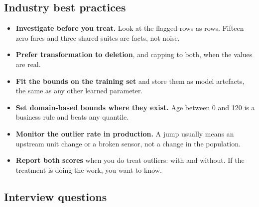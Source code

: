 \documentclass[11pt,a4paper]{article}
\begin{document}
\subsection*{Industry best practices}

\begin{itemize}\itemsep3pt
  \item \textbf{Investigate before you treat.} Look at the flagged rows as rows. Fifteen
        zero fares and three shared suites are facts, not noise.
  \item \textbf{Prefer transformation to deletion}, and capping to both, when the values
        are real.
  \item \textbf{Fit the bounds on the training set} and store them as model artefacts, the
        same as any other learned parameter.
  \item \textbf{Set domain-based bounds where they exist.} Age between 0 and 120 is a
        business rule and beats any quantile.
  \item \textbf{Monitor the outlier rate in production.} A jump usually means an upstream
        unit change or a broken sensor, not a change in the population.
  \item \textbf{Report both scores} when you do treat outliers: with and without. If the
        treatment is doing the work, you want to know.
\end{itemize}

\subsection*{Interview questions}
\end{document}

